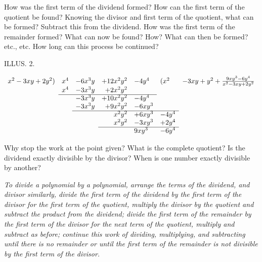 \documentclass{book}
\begin{document}
How was the first term of the dividend formed? How
can the first term of the quotient be found? Knowing the
divisor and first term of the quotient, what can be formed?
Subtract this from the dividend. How was the first term of
the remainder formed? What can now be found? How?
What can then be formed? etc., etc. How long can this
process be continued?

ILLUS. 2.
\begin{center}
\begin{math}
\begin{array}{rccrllccl}
 x^{2} - 3 x y + 2 y^{2} )& x^{4} & - 6 x^{3} y & +  12 x^{2} y^{2} & -  4 y^{4}& (x^{2} & - 3 x y + y^{2} + \frac{9 x y^{3} - 6 y^{4}}{x^{2} - 3 x y + 2 y^{2}} \\
                          & x^{4} & - 3 x^{3} y & +   2 x^{2} y^{2} \\
                          \cline{2-5}
                          &       & - 3 x^{3} y & +  10 x^{2} y^{2} & -  4 y^{4}\\
                          &       & - 3 x^{3} y & +   9 x^{2} y^{2} & -  6 x y^{3}\\
                          \cline{3-6}
                          &       &             &       x^{2} y^{2} & +  6 x y^{3} & - 4 y^{4}\\
                          &       &             &       x^{2} y^{2} & -  3 x y^{3} & + 2 y^{4}\\
                          \cline{4-6}
                          &       &             &                   &    9 x y^{3} & - 6 y^{4}
\end{array}
\end{math}
\end{center}

Why stop the work at the point given? What is the complete
quotient? Is the dividend exactly divisible by the divisor? When
is one number exactly divisible by another?


\textit{ To divide a polynomial by a polynomial, arrange the terms
of the dividend, and divisor similarly, divide the first term of
the dividend by the first term of the divisor for the first term
of the quotient, multiply the divisor by the quotient and subtract
the product from the dividend; divide the first term of the
remainder by the first term of the divisor for the next term of
the quotient, multiply and subtract as before; continue this work
of dividing, multiplying, and subtracting until there is no
remainder or until the first term of the remainder is not
divisible by the first term of the divisor.}
\end{document}
